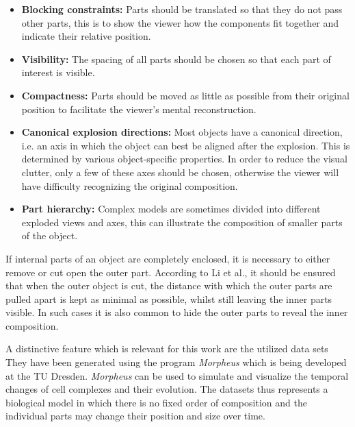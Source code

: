 \begin{itemize}
	\item \textbf{Blocking constraints:} Parts should be translated so that they do not pass other parts, this is to show the viewer how the components fit together and indicate their relative position.
	\item \textbf{Visibility:} The spacing of all parts should be chosen so that each part of interest is visible.
	\item \textbf{Compactness:} Parts should be moved as little as possible from their original position to facilitate the viewer's mental reconstruction.
	\item \textbf{Canonical explosion directions:} Most objects have a canonical direction, i.e. an axis in which the object can best be aligned after the explosion. This is determined by various object-specific properties. In order to reduce the visual clutter, only a few of these axes should be chosen, otherwise the viewer will have difficulty recognizing the original composition.
	\item \textbf{Part hierarchy:} Complex models are sometimes divided into different exploded views and axes, this can illustrate the composition of smaller parts of the object.
\end{itemize}

If internal parts of an object are completely enclosed, it is necessary to either remove or cut open the outer part. According to Li et al., it should be ensured that when the outer object is cut, the distance with which the outer parts are pulled apart is kept as minimal as possible, whilst still leaving the inner parts visible. %
In such cases it is also common to hide the outer parts to reveal the inner composition.

A distinctive feature which is relevant for this work are the utilized data sets
They have been generated using the program \emph{Morpheus} which is being developed at the TU Dresden. %
\emph{Morpheus} can be used to simulate and visualize the temporal changes of cell complexes and their evolution. 
The datasets thus represents a biological model in which there is no fixed order of composition and the individual parts may change their position and size over time.  